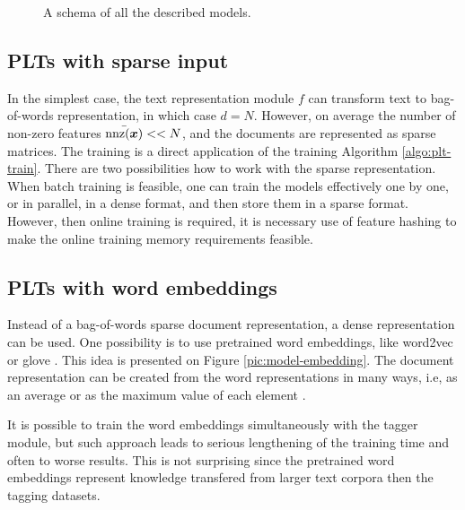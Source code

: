 \documentclass{article}
\newcommand{\sectionBefore}{-0pt}
\newcommand{\sectionAfter}{-0pt}
\begin{document}
\begin{figure}
	\begin{center}
		
	\end{center}
	\caption{A schema of all the described models.}
	\label{pic:module-repres-module-tag}
\end{figure}


\vspace{\sectionBefore}
\subsection{PLTs with sparse input}
\label{sec:sparse_input}
\vspace{\sectionAfter}

In the simplest case, the text representation module $f$ can transform text to bag-of-words representation, in which case $d=N$. However, on average the number of non-zero features $\bar{\mathrm{nnz}(\boldsymbol{x})} << N$, and the documents are represented as sparse matrices. The training is a direct application of the training Algorithm \ref{algo:plt-train}.
There are two possibilities how to work with the sparse representation. When batch training is feasible, one can train the models effectively one by one, or in parallel, in a dense format, and then store them in a sparse format. However, then online training is required, it is necessary use of feature hashing to make the online training memory requirements feasible. 

\vspace{\sectionBefore}
\subsection{PLTs with word embeddings}
\label{sec:sparse_input}
\vspace{\sectionAfter}

Instead of a bag-of-words sparse document representation, a dense representation can be used. 
One possibility is to use pretrained word embeddings, like word2vec \cite{word2vec} or glove \cite{glove}. This idea is presented on Figure \ref{pic:model-embedding}. The document representation can be created from the word representations in many ways, i.e, as an average \cite{!} or as the maximum value of each element \cite{!}.

It is possible to train the word embeddings simultaneously with the tagger module, but such approach leads to serious lengthening of the training time \cite{!!} and often to worse results\cite{!!}. This is not surprising since the pretrained word embeddings represent knowledge transfered from larger text corpora then the tagging datasets.
\end{document}
